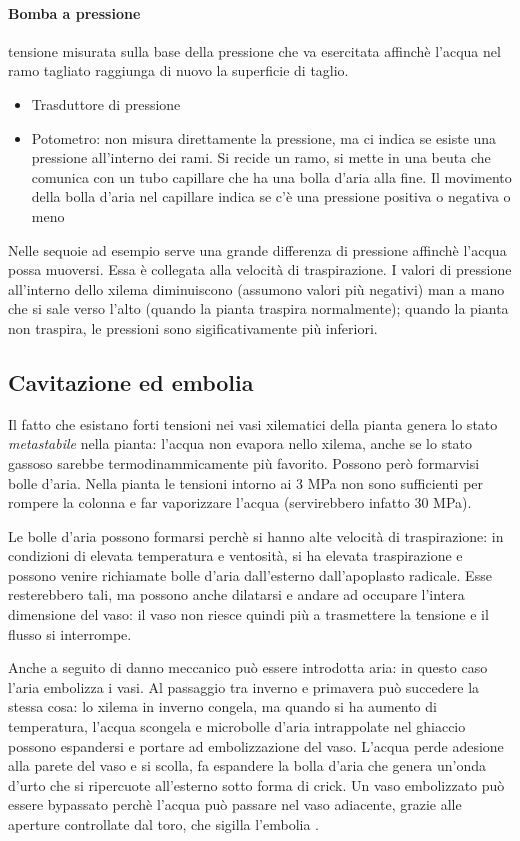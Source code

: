\documentclass[a4paper,12pt]{book}
\begin{document}
\paragraph{Bomba a pressione} tensione misurata sulla base della pressione che va esercitata affinchè l'acqua nel ramo tagliato raggiunga di nuovo la superficie di taglio.
\begin{itemize}
\item{Trasduttore di pressione}
\item{Potometro: non misura direttamente la pressione, ma ci indica se esiste una pressione all'interno dei rami. Si recide un ramo, si mette in una beuta che comunica con un tubo capillare che ha una bolla d'aria alla fine. Il movimento della bolla d'aria nel capillare indica se c'è una pressione positiva o negativa o meno}
\end{itemize}

Nelle sequoie ad esempio serve una grande differenza di pressione affinchè l'acqua possa muoversi. Essa è collegata alla velocità di traspirazione. I valori di pressione all'interno dello xilema diminuiscono (assumono valori più negativi) man a mano che si sale verso l'alto (quando la pianta traspira normalmente); quando la pianta non traspira, le pressioni sono sigificativamente più inferiori.

\subsection{Cavitazione ed embolia}
Il fatto che esistano forti tensioni nei vasi xilematici della pianta genera lo stato \emph{metastabile} nella pianta: l'acqua non evapora nello xilema, anche se lo stato gassoso sarebbe termodinammicamente più favorito. Possono però formarvisi bolle d'aria. Nella pianta le tensioni intorno ai 3 MPa non sono sufficienti per rompere la colonna e far vaporizzare l'acqua (servirebbero infatto 30 MPa).

Le bolle d'aria possono formarsi perchè si hanno alte velocità di traspirazione: in condizioni di elevata temperatura e ventosità, si ha elevata traspirazione e possono venire richiamate bolle d'aria dall'esterno dall'apoplasto radicale. Esse resterebbero tali, ma possono anche dilatarsi e andare ad occupare l'intera dimensione del vaso: il vaso non riesce quindi più a trasmettere la tensione e il flusso si interrompe.

Anche a seguito di danno meccanico può essere introdotta aria: in questo caso l'aria embolizza i vasi.
Al passaggio tra inverno e primavera può succedere la stessa cosa: lo xilema in inverno congela, ma quando si ha aumento di temperatura, l'acqua scongela e microbolle d'aria intrappolate nel ghiaccio possono espandersi e portare ad embolizzazione del vaso. L'acqua perde adesione alla parete del vaso e si scolla, fa espandere la bolla d'aria che genera un'onda d'urto che si ripercuote all'esterno sotto forma di crick.
Un vaso embolizzato può essere bypassato perchè l'acqua può passare nel vaso adiacente, grazie alle aperture controllate dal toro, che sigilla l'embolia .
\end{document}
